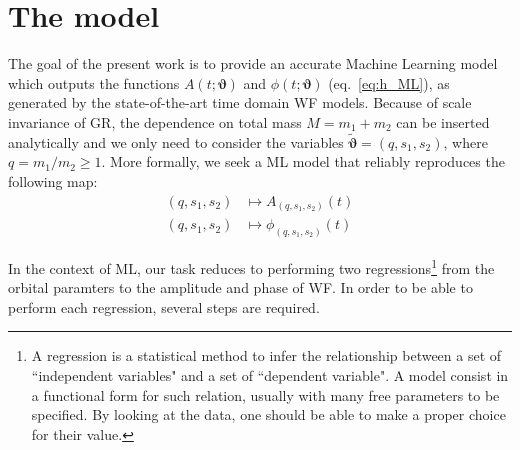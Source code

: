 
\section{The model}
\label{sec: model}
%
The goal of the present work is to provide an accurate Machine Learning model which outputs the functions $A(t;\boldsymbol{\vartheta})$ and $\phi(t;\boldsymbol{\vartheta})$ (eq.~\eqref{eq:h_ML}), as generated by the state-of-the-art time domain WF models.
Because of scale invariance of GR, the dependence on total mass $M= m_1+m_2$ can be inserted analytically \cite{Arbey2019scaling} and we only need to consider the variables $\tilde{\boldsymbol{\vartheta}} = (q, s_1, s_2)$, where $q= m_1/m_2 \geq 1$.
More formally, we seek a ML model that reliably reproduces the following map:
\begin{align}
	(q, s_1, s_2) &\longmapsto A_{(q, s_1, s_2)}(t) \label{eq:objective_amp}\\
	(q, s_1, s_2) &\longmapsto \phi_{(q, s_1, s_2)}(t) \label{eq:objective_ph}
\end{align}
\par
In the context of ML, our task reduces to performing two regressions\footnote{A regression is a statistical method to infer the relationship between a set of ``independent variables" and a set of ``dependent variable". A model consist in a functional form for such relation, usually with many free parameters to be specified. By looking at the data, one should be able to make a proper choice for their value.} 
from the orbital paramters to the amplitude and phase of WF. 
In order to be able to perform each regression, several steps are required.

